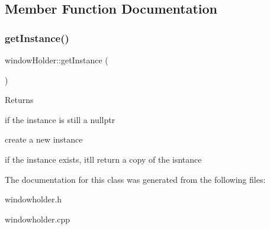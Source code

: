 \subsection{Member Function Documentation}
\mbox{\label{classwindow_holder_a9e3b852dff2680e161c9cae0b1eaa11d}} 
\subsubsection{\texorpdfstring{get\+Instance()}{getInstance()}}
{\footnotesize\ttfamily window\+Holder\+::get\+Instance (\begin{DoxyParamCaption}{ }\end{DoxyParamCaption})\hspace{0.3cm}{\ttfamily [static]}}

\begin{DoxyReturn}{Returns}

\end{DoxyReturn}
if the instance is still a nullptr

create a new instance

if the instance exists, it\textquotesingle{}ll return a copy of the isntance 

The documentation for this class was generated from the following files\+:\begin{DoxyCompactItemize}
\item 
windowholder.\+h\item 
windowholder.\+cpp\end{DoxyCompactItemize}
